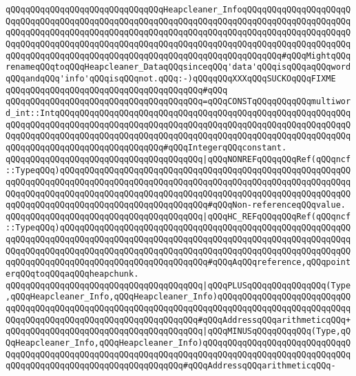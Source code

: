 \newline
\verb|qQQqqQQqqQQqqQQqqQQqqQQqqQQqqQQqHeapcleaner_InfoqQQqqQQqqQQqqQQqqQQqqQQqqQQqqQQqqQQqqQQqqQQqqQQqqQQqqQQqqQQqqQQqqQQqqQQqqQQqqQQqqQQqqQQqqQQqqQQqqQQqqQQqqQQqqQQqqQQqqQQqqQQqqQQqqQQqqQQqqQQqqQQqqQQqqQQqqQQqqQQqqQQqqQQqqQQqqQQqqQQqqQQqqQQqqQQqqQQqqQQqqQQqqQQqqQQqqQQqqQQqqQQqqQQqqQQqqQQqqQQqqQQqqQQqqQQqqQQqqQQqqQQqqQQqqQQqqQQqqQQqqQQqqQQq#qQQqMightqQQqrenameqQQqtoqQQqHeapcleaner_DataqQQqsinceqQQq'data'qQQqisqQQqaqQQqwordqQQqandqQQq'info'qQQqisqQQqnot.qQQq:-)qQQqqQQqXXXqQQqSUCKOqQQqFIXME|\newline
\verb|qQQqqQQqqQQqqQQqqQQqqQQqqQQqqQQqqQQqqQQq#qQQq|\newline
\verb|qQQqqQQqqQQqqQQqqQQqqQQqqQQqqQQqqQQqqQQq=qQQqCONSTqQQqqQQqqQQqmultiword_int::IntqQQqqQQqqQQqqQQqqQQqqQQqqQQqqQQqqQQqqQQqqQQqqQQqqQQqqQQqqQQqqQQqqQQqqQQqqQQqqQQqqQQqqQQqqQQqqQQqqQQqqQQqqQQqqQQqqQQqqQQqqQQqqQQqqQQqqQQqqQQqqQQqqQQqqQQqqQQqqQQqqQQqqQQqqQQqqQQqqQQqqQQqqQQqqQQqqQQqqQQqqQQqqQQqqQQqqQQqqQQqqQQqqQQqqQQq#qQQqIntegerqQQqconstant.|\newline
\verb|qQQqqQQqqQQqqQQqqQQqqQQqqQQqqQQqqQQqqQQq|\verb#|qQQqNONREFqQQqqQQqRef(qQQqncf::TypeqQQq)qQQqqQQqqQQqqQQqqQQqqQQqqQQqqQQqqQQqqQQqqQQqqQQqqQQqqQQqqQQqqQQqqQQqqQQqqQQqqQQqqQQqqQQqqQQqqQQqqQQqqQQqqQQqqQQqqQQqqQQqqQQqqQQqqQQqqQQqqQQqqQQqqQQqqQQqqQQqqQQqqQQqqQQqqQQqqQQqqQQqqQQqqQQqqQQqqQQqqQQqqQQqqQQqqQQqqQQqqQQqqQQqqQQqqQQqqQQqqQQq#\verb|#qQQqNon-referenceqQQqvalue.|\newline
\verb|qQQqqQQqqQQqqQQqqQQqqQQqqQQqqQQqqQQqqQQq|\verb#|qQQqHC_REFqQQqqQQqRef(qQQqncf::TypeqQQq)qQQqqQQqqQQqqQQqqQQqqQQqqQQqqQQqqQQqqQQqqQQqqQQqqQQqqQQqqQQqqQQqqQQqqQQqqQQqqQQqqQQqqQQqqQQqqQQqqQQqqQQqqQQqqQQqqQQqqQQqqQQqqQQqqQQqqQQqqQQqqQQqqQQqqQQqqQQqqQQqqQQqqQQqqQQqqQQqqQQqqQQqqQQqqQQqqQQqqQQqqQQqqQQqqQQqqQQqqQQqqQQqqQQqqQQqqQQqqQQq#\verb|#qQQqAqQQqreference,qQQqpointerqQQqtoqQQqaqQQqheapchunk.|\newline
\verb|qQQqqQQqqQQqqQQqqQQqqQQqqQQqqQQqqQQqqQQq|\verb#|qQQqPLUSqQQqqQQqqQQqqQQq(Type,qQQqHeapcleaner_Info,qQQqHeapcleaner_Info)qQQqqQQqqQQqqQQqqQQqqQQqqQQqqQQqqQQqqQQqqQQqqQQqqQQqqQQqqQQqqQQqqQQqqQQqqQQqqQQqqQQqqQQqqQQqqQQqqQQqqQQqqQQqqQQqqQQqqQQqqQQqqQQqqQQqqQQq#\verb|#qQQqAddressqQQqarithmeticqQQq+|\newline
\verb|qQQqqQQqqQQqqQQqqQQqqQQqqQQqqQQqqQQqqQQq|\verb#|qQQqMINUSqQQqqQQqqQQq(Type,qQQqHeapcleaner_Info,qQQqHeapcleaner_Info)qQQqqQQqqQQqqQQqqQQqqQQqqQQqqQQqqQQqqQQqqQQqqQQqqQQqqQQqqQQqqQQqqQQqqQQqqQQqqQQqqQQqqQQqqQQqqQQqqQQqqQQqqQQqqQQqqQQqqQQqqQQqqQQqqQQqqQQq#\verb|#qQQqAddressqQQqarithmeticqQQq-|\newline
